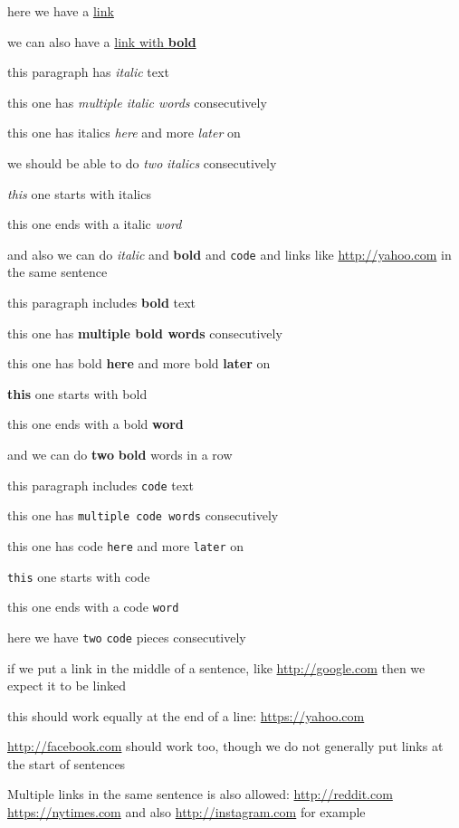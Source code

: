 
here we have a \href{http://github.com}{link}

we can also have a \href{http://github.com}{link with \textbf{bold}}

this paragraph has \emph{italic}  text

this one has \emph{multiple italic words}  consecutively

this one has italics \emph{here} and more \emph{later}  on

we should be able to do \emph{two} \emph{italics} consecutively

\emph{this} one starts with italics

this one ends with a italic \emph{word}

and also we can do \emph{italic} and \textbf{bold} and \verb|code| and links like \url{http://yahoo.com} in the same sentence

this paragraph includes \textbf{bold}  text

this one has \textbf{multiple bold words} consecutively

this one has bold \textbf{here} and more bold \textbf{later}  on

\textbf{this} one starts with bold

this one ends with a bold \textbf{word}

and we can do \textbf{two} \textbf{bold} words in a row

this paragraph includes \verb|code|  text

this one has \verb|multiple code words|  consecutively

this one has code \verb|here| and more \verb|later|  on

\verb|this| one starts with code

this one ends with a code \verb|word|

here we have \verb|two| \verb|code| pieces consecutively

if we put a link in the middle of a sentence, like \url{http://google.com} then we expect it to be linked

this should work equally at the end of a line: \url{https://yahoo.com}

\url{http://facebook.com} should work too, though we do not generally put links at the start of sentences

Multiple links in the same sentence is also allowed: \url{http://reddit.com} \url{https://nytimes.com} and also \url{http://instagram.com} for example
